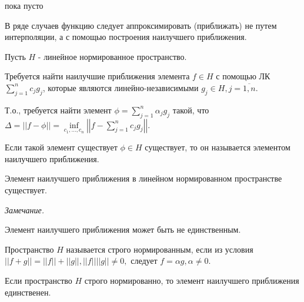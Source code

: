 \begin{col-answer-preambule}
	\begin{plan}
    \item пока пусто
	\end{plan}
\end{col-answer-preambule}


В ряде случаев функцию следует аппроксимировать (приближать) не путем интерполяции, а с помощью построения наилучшего приближения.

Пусть $H$ - линейное нормированное пространство.

Требуется найти наилучшие приближения элемента $f \in H$ с помощью ЛК $\sum\limits_{j=1}^n c_j g_{j}$, которые являются линейно-независимыми $g_j \in H, j = \overline{1, n}$.

Т.о., требуется найти элемент $\phi = \sum\limits_{j=1}^n \alpha_j g_j$ такой, что $\Delta = \left| \left| f - \phi \right| \right| = \inf\limits_{c_1, \ldots, c_n} \left| \left| f - \sum\limits_{j=1}^n c_j g_j \right| \right|$.

Если такой элемент существует $\phi \in H$ существует, то он называется элементом наилучшего приближения.

\begin{theorem}
  Элемент наилучшего приближения в линейном нормированном пространстве существует.
\end{theorem}

\textit{Замечание.}

Элемент наилучшего приближения может быть не единственным.

Пространство $H$ называется строго нормированным, если из условия $|| f + g|| = ||f|| + ||g||, ||f|| ||g|| \ne 0,$ следует $f = \alpha g, \alpha \ne 0$.

\begin{theorem}
  Если пространство $H$ строго нормированно, то элемент наилучшего приближения единственен.
\end{theorem}
